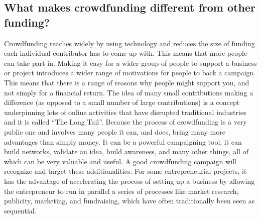 \subsection*{ What makes crowdfunding different from other funding? }
Crowdfunding reaches widely by using technology and reduces the size of funding each individual contributor has to come up with. This means that more people can take part in.
Making it easy for a wider group of people to support a business or project introduces a wider range of motivations for people to back a campaign. This means that there is a range of reasons why people might support you, and not simply for a financial return.
The idea of many small contributions making a difference (as opposed to a small number of large contributions) is a concept underpinning lots of online activities that have disrupted traditional industries and it is called “The Long Tail”.
Because the process of crowdfunding is a very public one and involves many people it can, and does, bring many more advantages than simply money. It can be a powerful campaigning tool, it can build networks, validate an idea, build awareness, and many other things, all of which can be very valuable and useful. A good crowdfunding campaign will recognize and target these additionalities.
For some entrepreneurial projects, it has the advantage of accelerating the process of setting up a business by allowing the entrepreneur to run in parallel a series of processes like market research, publicity, marketing, and fundraising, which have often traditionally been seen as sequential.







